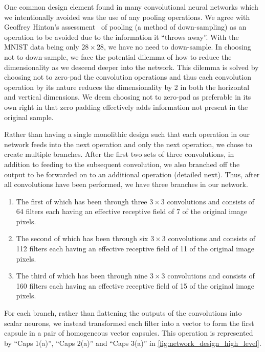 \documentclass{article}
\newcommand{\rightparenthesis}{)}
\begin{document}
One common design element found in many convolutional neural networks which we intentionally avoided was the use of any pooling operations.  We agree with Geoffrey Hinton's assessment~\cite{Hinton2018b} of pooling (a method of down-sampling) as an operation to be avoided due to the information it ``throws away''.  With the MNIST data being only \(28\times28\), we have no need to down-sample.  In choosing not to down-sample, we face the potential dilemma of how to reduce the dimensionality as we descend deeper into the network.  This dilemma is solved by choosing not to zero-pad the convolution operations and thus each convolution operation by its nature reduces the dimensionality by 2 in both the horizontal and vertical dimensions.  We deem choosing not to zero-pad as preferable in its own right in that zero padding effectively adds information not present in the original sample.

Rather than having a single monolithic design such that each operation in our network feeds into the next operation and only the next operation, we chose to create multiple branches.  After the first two sets of three convolutions, in addition to feeding to the subsequent convolution, we also branched off the output to be forwarded on to an additional operation (detailed next).  Thus, after all convolutions have been performed, we have three branches in our network.
\begin{enumerate}[label=\arabic*\rightparenthesis]
\item The first of which has been through three \(3\times{}3\) convolutions and consists of 64 filters each having an effective receptive field of 7 of the original image pixels.
\item The second of which has been through six \(3\times{}3\) convolutions and consists of 112 filters each having an effective receptive field of 11 of the original image pixels.
\item The third of which has been through nine \(3\times{}3\) convolutions and consists of 160 filters each having an effective receptive field of 15 of the original image pixels.
\end{enumerate}

For each branch, rather than flattening the outputs of the convolutions into scalar neurons, we instead transformed each filter into a vector to form the first capsule in a pair of homogeneous vector capsules.  This operation is represented by ``Caps 1(a)'', ``Caps 2(a)'' and ``Caps 3(a)'' in \autoref{fig:network_design_high_level}.
\end{document}
